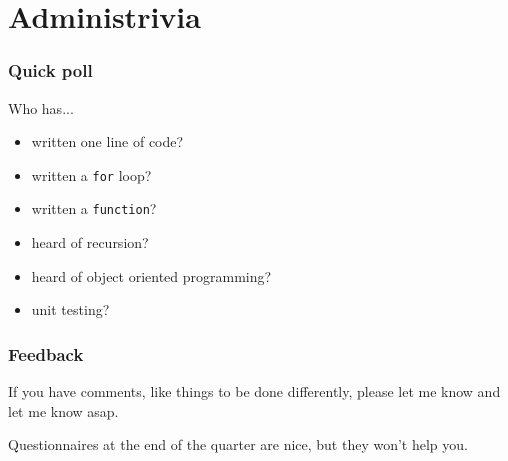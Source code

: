 
\section{Administrivia} %
\label{sec:administrivia}





\begin{frame}\frametitle{Quick poll}

    Who has...
    \begin{itemize}
        \item written one line of code?
        \pause
        \item written a \texttt{for} loop?
        \pause
        \item written a \texttt{function}?
        \pause
        \item heard of recursion?
        \pause
        \item heard of object oriented programming?
        \pause
        \item unit testing?
    \end{itemize}
\end{frame}

\begin{frame}\frametitle{Feedback}

    If you have comments, like things to be done differently, please let me know
    and let me know asap.

    \vfill

    Questionnaires at the end of the quarter are nice, but they won't help you.

\end{frame}

